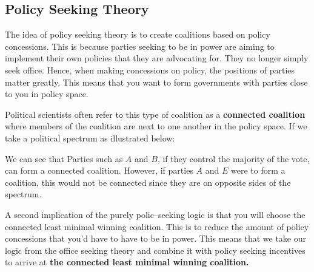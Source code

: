\documentclass[12pt, letterpaper]{article}
\begin{document}
\subsection{Policy Seeking Theory}
The idea of policy seeking theory is to create coalitions based on policy concessions. This is because parties seeking to be in power are aiming to implement their own policies that they are advocating for. They no longer simply seek office. Hence, when making concessions on policy, the positions of parties matter greatly. This means that you want to form governments with parties close to you in policy space. 

Political scientists often refer to this type of coalition as a \textbf{connected coalition} where members of the coalition are next to one another in the policy space. If we take a political spectrum as illustrated below:
\begin{center}
\end{center}

We can see that Parties such as $A$ and $B$, if they control the majority of the vote, can form a connected coalition. However, if parties $A$ and $E$ were to form a coalition, this would not be connected since they are on opposite sides of the spectrum.

A second implication of the purely polic--seeking logic is that you will choose the connected least minimal winning coalition. This is to reduce the amount of policy concessions that you'd have to have to be in power. This means that we take our logic from the office seeking theory and combine it with policy seeking incentives to arrive at \textbf{the connected least minimal winning coalition.}


\newpage
\end{document}
